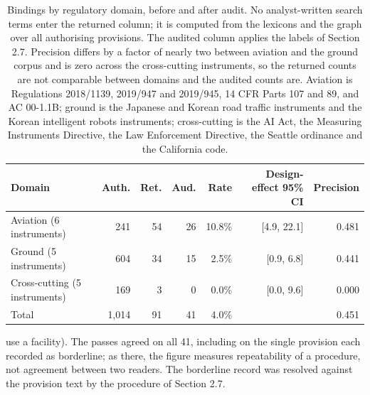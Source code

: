\begin{table}[!htb]
\centering
\caption{Bindings by regulatory domain, before and after audit. No analyst-written search terms enter the returned column; it is computed from the lexicons and the graph over all authorising provisions. The audited column applies the labels of Section 2.7. Precision differs by a factor of nearly two between aviation and the ground corpus and is zero across the cross-cutting instruments, so the returned counts are not comparable between domains and the audited counts are. Aviation is Regulations 2018/1139, 2019/947 and 2019/945, 14 CFR Parts 107 and 89, and AC 00-1.1B; ground is the Japanese and Korean road traffic instruments and the Korean intelligent robots instruments; cross-cutting is the AI Act, the Measuring Instruments Directive, the Law Enforcement Directive, the Seattle ordinance and the California code.}
\label{tab:t9}
\small
\begin{tabular}{@{}lrrrrrr@{}}
\toprule
Domain & Auth. & Ret. & Aud. & Rate & Design-effect 95\% CI & Precision \\
\midrule
Aviation (6 instruments) & 241 & 54 & 26 & 10.8\% & [4.9, 22.1] & 0.481 \\
Ground (5 instruments) & 604 & 34 & 15 & 2.5\% & [0.9, 6.8] & 0.441 \\
Cross-cutting (5 instruments) & 169 & 3 & 0 & 0.0\% & [0.0, 9.6] & 0.000 \\
Total & 1,014 & 91 & 41 & 4.0\% &  & 0.451 \\
\bottomrule
\end{tabular}
\end{table}

use a facility). The passes agreed on all 41, including on the single provision each recorded as borderline; as there, the figure measures repeatability of a procedure, not agreement between two readers. The borderline record was resolved against the provision text by the procedure of Section 2.7.

